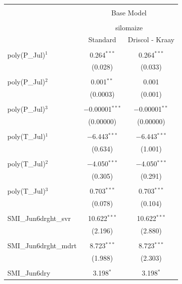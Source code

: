 \documentclass[12pt]{iopart}
\begin{document}
\begin{table}[!htbp] \centering 
	\caption{} 
	\label{} 
	{\tiny
	\begin{tabular}{@{\extracolsep{5pt}}lcc} 
		\\[-1.8ex]\hline 
		\hline \\[-1.8ex] 
		& \multicolumn{2}{c}{Base Model} \\ 
		\cline{2-3} 
		\\[-1.8ex] & \multicolumn{2}{c}{silomaize} \\ 
		& Standard & Driscol - Kraay \\ 
		\hline \\[-1.8ex] 
		poly(P\_Jul)$^{1}$ & 0.264$^{***}$ & 0.264$^{***}$ \\ 
		& (0.028) & (0.033) \\ 
		& & \\ 
		poly(P\_Jul)$^{2}$ & 0.001$^{**}$ & 0.001 \\ 
		& (0.0003) & (0.001) \\ 
		& & \\ 
		poly(P\_Jul)$^{3}$ & $-$0.00001$^{***}$ & $-$0.00001$^{**}$ \\ 
		& (0.00000) & (0.00000) \\ 
		& & \\ 
		poly(T\_Jul)$^{1}$ & $-$6.443$^{***}$ & $-$6.443$^{***}$ \\ 
		& (0.634) & (1.001) \\ 
		& & \\ 
		poly(T\_Jul)$^{2}$ & $-$4.050$^{***}$ & $-$4.050$^{***}$ \\ 
		& (0.305) & (0.291) \\ 
		& & \\ 
		poly(T\_Jul)$^{3}$ & 0.703$^{***}$ & 0.703$^{***}$ \\ 
		& (0.078) & (0.104) \\ 
		& & \\ 
		SMI\_Jun6drght\_svr & 10.622$^{***}$ & 10.622$^{***}$ \\ 
		& (2.196) & (2.880) \\ 
		& & \\ 
		SMI\_Jun6drght\_mdrt & 8.723$^{***}$ & 8.723$^{***}$ \\ 
		& (1.988) & (2.303) \\ 
		& & \\ 
		SMI\_Jun6dry & 3.198$^{*}$ & 3.198$^{*}$ \\ 

\end{tabular}}
\end{table}
\end{document}
